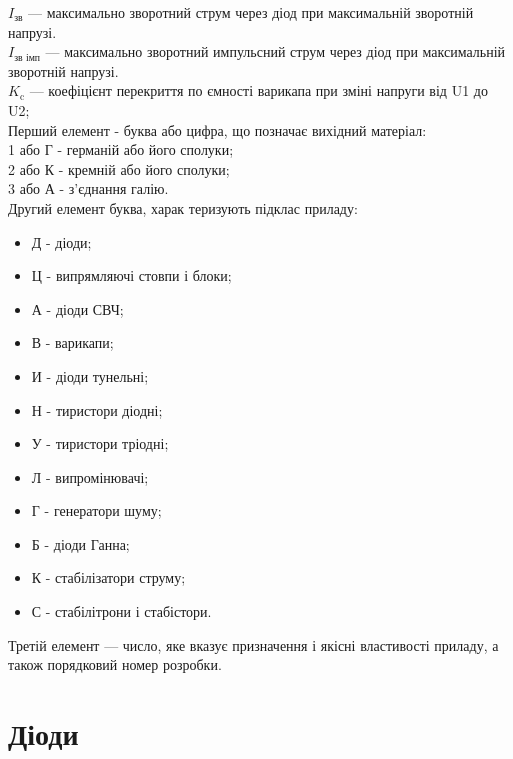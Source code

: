 \documentclass[a4paper,14pt]{extreport}
\begin{document}
$I_{\text{зв}}$ --- максимально зворотний струм через діод при максимальній зворотній напрузі.\\

$I_{\text{зв імп}}$ --- максимально зворотний импульсний струм через діод при максимальній зворотній напрузі.\\

$K_{\text{c}}$ --- коефіцієнт перекриття по ємності варикапа при зміні напруги від U1 до U2;\\

Перший елемент - буква або цифра, що позначає вихідний матеріал:\\

1 або Г - германій або його сполуки; \\

2 або К - кремній або його сполуки; \\

3 або А - з'єднання галію.  \\

Другий елемент буква, харак теризують підклас приладу:\\
\begin{itemize}
\item  Д - діоди;
\item  Ц - випрямляючі стовпи і блоки;
\item  А - діоди СВЧ;
\item  В - варикапи;
\item  И - діоди тунельні;
\item  Н - тиристори діодні;
\item  У - тиристори тріодні;
\item  Л - випромінювачі;
\item  Г - генератори шуму;
\item  Б - діоди Ганна;
\item  К - стабілізатори струму;
\item  С - стабілітрони і стабістори. \\
\end{itemize}

Третій елемент --- число, яке вказує призначення і якісні властивості приладу, а також порядковий номер розробки.
\newpage

\newpage
\chapter{Діоди}
\end{document}
